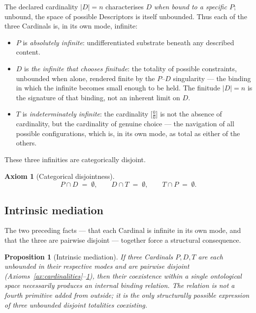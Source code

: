\documentclass[11pt,a4paper]{article}
\newtheorem{proposition}[theorem]{Proposition}
\theoremstyle{definition}
\newtheorem{axiom}[theorem]{Axiom}
\theoremstyle{remark}
\begin{document}
The declared cardinality $|D|=n$ characterises $D$ \emph{when bound to a specific $P$}; unbound, the space of possible Descriptors is itself unbounded. Thus each of the three Cardinals is, in its own mode, infinite:
\begin{itemize}[leftmargin=*]
\item $P$ is \emph{absolutely infinite}: undifferentiated substrate beneath any described content.
\item $D$ is \emph{the infinite that chooses finitude}: the totality of possible constraints, unbounded when alone, rendered finite by the $P$--$D$ singularity --- the binding in which the infinite becomes small enough to be held. The finitude $|D|=n$ is the signature of that binding, not an inherent limit on $D$.
\item $T$ is \emph{indeterminately infinite}: the cardinality $\bigl[\tfrac{0}{0}\bigr]$ is not the absence of cardinality, but the cardinality of genuine choice --- the navigation of all possible configurations, which is, in its own mode, as total as either of the others.
\end{itemize}

These three infinities are categorically disjoint.

\begin{axiom}[Categorical disjointness]\label{ax:disjoint}
\[
P \cap D \;=\; \emptyset, \qquad D \cap T \;=\; \emptyset, \qquad T \cap P \;=\; \emptyset.
\]
\end{axiom}

\subsection{Intrinsic mediation}

The two preceding facts --- that each Cardinal is infinite in its own mode, and that the three are pairwise disjoint --- together force a structural consequence.

\begin{proposition}[Intrinsic mediation]\label{prop:intrinsic}
If three Cardinals $P,D,T$ are each unbounded in their respective modes and are pairwise disjoint (Axioms~\ref{ax:cardinalities}--\ref{ax:disjoint}), then their coexistence within a single ontological space necessarily produces an internal binding relation. The relation is not a fourth primitive added from outside; it is the only structurally possible expression of three unbounded disjoint totalities coexisting.
\end{proposition}
\end{document}
